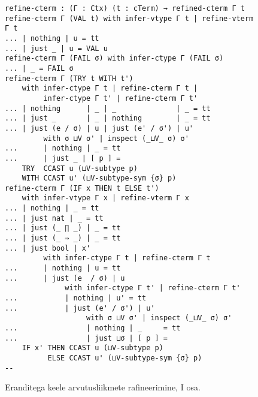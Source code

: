 \documentclass[a4paper,12pt]{article}
\begin{document}
\begin{figure}
  \begin{BVerbatim}
refine-cterm : (Γ : Ctx) (t : cTerm) → refined-cterm Γ t
refine-cterm Γ (VAL t) with infer-vtype Γ t | refine-vterm Γ t
... | nothing | u = tt
... | just _ | u = VAL u
refine-cterm Γ (FAIL σ) with infer-ctype Γ (FAIL σ)
... | _ = FAIL σ
refine-cterm Γ (TRY t WITH t')
    with infer-ctype Γ t | refine-cterm Γ t |
         infer-ctype Γ t' | refine-cterm Γ t'
... | nothing      | _ | _              | _ = tt
... | just _       | _ | nothing        | _ = tt
... | just (e / σ) | u | just (e' / σ') | u'
         with σ ⊔V σ' | inspect (_⊔V_ σ) σ'
...      | nothing | _ = tt
...      | just _ | [ p ] =
    TRY  CCAST u (⊔V-subtype p)
    WITH CCAST u' (⊔V-subtype-sym {σ} p)
refine-cterm Γ (IF x THEN t ELSE t')
    with infer-vtype Γ x | refine-vterm Γ x
... | nothing | _ = tt
... | just nat | _ = tt
... | just (_ ∏ _) | _ = tt
... | just (_ ⇒ _) | _ = tt
... | just bool | x'
         with infer-ctype Γ t | refine-cterm Γ t
...      | nothing | u = tt
...      | just (e  / σ) | u
              with infer-ctype Γ t' | refine-cterm Γ t'
...           | nothing | u' = tt
...           | just (e' / σ') | u'
                   with σ ⊔V σ' | inspect (_⊔V_ σ) σ'
...                | nothing | _     = tt
...                | just ⊔σ | [ p ] =
    IF x' THEN CCAST u (⊔V-subtype p)
          ELSE CCAST u' (⊔V-subtype-sym {σ} p)
--
  \end{BVerbatim}
  \caption{Eranditega keele arvutusliikmete rafineerimine, I osa.}
  \label{fig:exc.refine-cterm1}
\end{figure}
\end{document}
